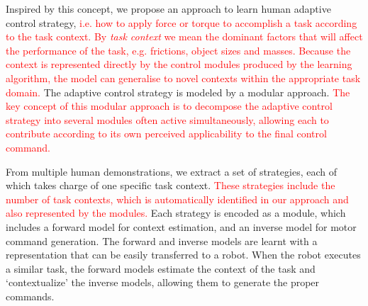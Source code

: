Inspired by this concept, we propose an approach to learn human
adaptive control strategy, \textcolor{red}{i.e. how to apply force or
  torque to accomplish a task according to the task context. By {\em
    task context} we mean the dominant factors that will affect the
  performance of the task, e.g. frictions, object sizes and masses.
  Because the context is represented directly by the control modules
  produced by the learning algorithm, the model can generalise to
  novel contexts within the appropriate task domain.}  The adaptive
control strategy is modeled by a modular approach.
\textcolor{red}{The key concept of this modular approach is to
  decompose the adaptive control strategy into several modules often
  active simultaneously, allowing each to contribute according to its
  own perceived applicability to the final control command.}


From multiple human demonstrations, we extract a set of strategies,
each of which takes charge of one specific task
context. \textcolor{red}{These strategies include the number of task
  contexts, which is automatically
  identified in our approach and also represented by the modules. } Each strategy is encoded as a module,
which includes a forward model for context estimation, and an inverse
model for motor command generation.  %
The forward and inverse models are learnt with a representation
that can be easily transferred to a
robot. When the robot executes a similar task, the forward models
estimate the context of the task and
`contextualize' the inverse models, allowing them to generate the proper commands.


